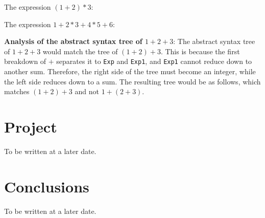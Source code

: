 \documentclass{article}
\theoremstyle{theorem}
\theoremstyle{definition}
\theoremstyle{remark}
\begin{document}
The expression $(1+2)*3$:\newline

\hfil
{}
\hfil

\newpage
The expression $1+2*3+4*5+6$:\newline

\hfil
{}
\hfil

\noindent \textbf{Analysis of the abstract syntax tree of $1+2+3$}:
The abstract syntax tree of $1+2+3$ would match the tree of $(1+2)+3$. This is because the first breakdown of $+$ separates it to \texttt{Exp} and \texttt{Exp1}, and \texttt{Exp1} cannot reduce down to another sum. Therefore, the right side of the tree must become an integer, while the left side reduces down to a sum. The resulting tree would be as follows, which matches $(1+2)+3$ and not $1+(2+3)$.

\hfil
{}
\hfil

\section{Project}

To be written at a later date.

\section{Conclusions}\label{conclusions}

To be written at a later date.
\end{document}
